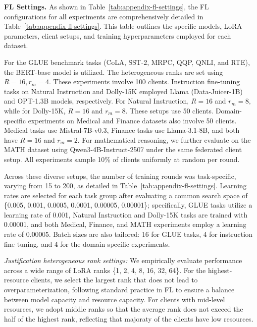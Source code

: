 \documentclass{article} %
\begin{document}
\noindent\textbf{FL Settings.} As shown in Table~\ref{tab:appendix-fl-settings}, the FL configurations for all experiments are comprehensively detailed in Table~\ref{tab:appendix-fl-settings}. This table outlines the specific models, LoRA parameters, client setups, and training hyperparameters employed for each dataset.

For the GLUE benchmark tasks (CoLA, SST-2, MRPC, QQP, QNLI, and RTE), the BERT-base model is utilized. The heterogeneous ranks are set using $R=16, r_m=4$. 
These experiments involve 100 clients. 
%
Instruction fine-tuning tasks on Natural Instruction and Dolly-15K employed Llama (Data-Juicer-1B) and OPT-1.3B models, respectively. For Natural Instruction, $R=16$ and $ r_m=8$, while for Dolly-15K, $R=16$ and $ r_m=8$. 
These setups use 50 clients. 
%
Domain-specific experiments on Medical and Finance datasets also involve 50 clients. Medical tasks use Mistral-7B-v0.3, Finance tasks use Llama-3.1-8B, and both have $R=16$ and $ r_m=2$. {For mathematical reasoning, we further evaluate on the MATH dataset using Qwen3-4B-Instruct-2507 under the same federated client setup.} All experiments sample 10\% of clients uniformly at random per round.  %


Across these diverse setups, the number of training rounds was task-specific, varying from 15 to 200, as detailed in Table~\ref{tab:appendix-fl-settings}. Learning rates are selected for each task group after evaluating a common search space of \{0.005, 0.001, 0.0005, 0.0001, 0.00005, 0.00001\}; specifically, GLUE tasks utilize a learning rate of 0.001, Natural Instruction and Dolly-15K tasks are trained with 0.00001, and both {Medical, Finance, and MATH} experiments employ a learning rate of 0.00005. Batch sizes are also tailored: 16 for GLUE tasks, 4 for instruction fine-tuning, and 4 for the domain-specific experiments. 

\textit{Justification heterogeneous rank settings:} We empirically evaluate performance across a wide range of LoRA ranks \{1, 2, 4, 8, 16, 32, 64\}. For the highest-resource clients, we select the largest rank that does not lead to overparameterization, following standard practice in FL to ensure a balance between model capacity and resource capacity. For clients with mid-level resources, we adopt middle ranks so that the average rank does not excced the half of the highest rank, reflecting that majoraty of the clients have low resources. 
\end{document}
